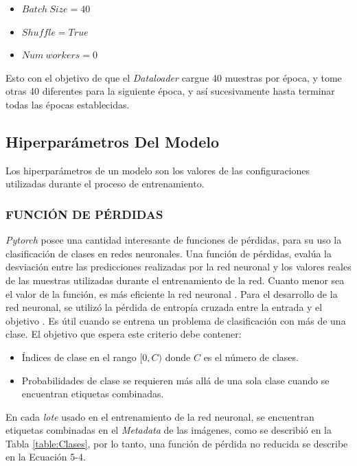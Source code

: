 		\begin{itemize}
			\item $Batch \ Size = 40$
			\item $Shuffle = True$
			\item $Num \ workers = 0$
		\end{itemize}

		Esto con el objetivo de que el \textit{Dataloader} cargue 40 muestras por época, y tome otras 40 diferentes para la siguiente época, y así sucesivamente hasta terminar todas las épocas establecidas.  
		
		
		
			
		
		\subsection{Hiperparámetros Del Modelo}
		
		Los hiperparámetros de un modelo son los valores de las configuraciones utilizadas durante el proceso de entrenamiento.
		
			\subsubsection{FUNCIÓN DE PÉRDIDAS}		
			
			\textit{Pytorch} posee una cantidad interesante de funciones de pérdidas, para su uso la clasificación de clases en redes neuronales. Una función de pérdidas, evalúa la desviación entre las predicciones realizadas por la red neuronal y los valores reales de las muestras utilizadas durante el entrenamiento de la red. Cuanto menor sea el valor de la función, es más eficiente la red neuronal \cite{mathivet2018inteligencia}. 	
			Para el desarrollo de la red neuronal, se utilizó la pérdida de entropía cruzada entre la entrada y el objetivo \cite{Pytorch}. Es útil cuando se entrena un problema de clasificación con más de una clase.  El objetivo que espera este criterio debe contener:
			
			\begin{itemize}
				\item Índices de clase en el rango $[0,C)$ donde $C$ es el número de clases.
				\item Probabilidades de clase se requieren más allá de una sola clase cuando se encuentran etiquetas combinadas.				 
			\end{itemize}
			
			En cada \textit{lote} usado en el entrenamiento de la red neuronal, se encuentran etiquetas combinadas en el \textit{Metadata} de las imágenes, como se describió en la Tabla \ref{table:Clases}, por lo tanto, una función de pérdida no reducida \cite{Pytorch} se describe en la Ecuación 5-4.\\
			
